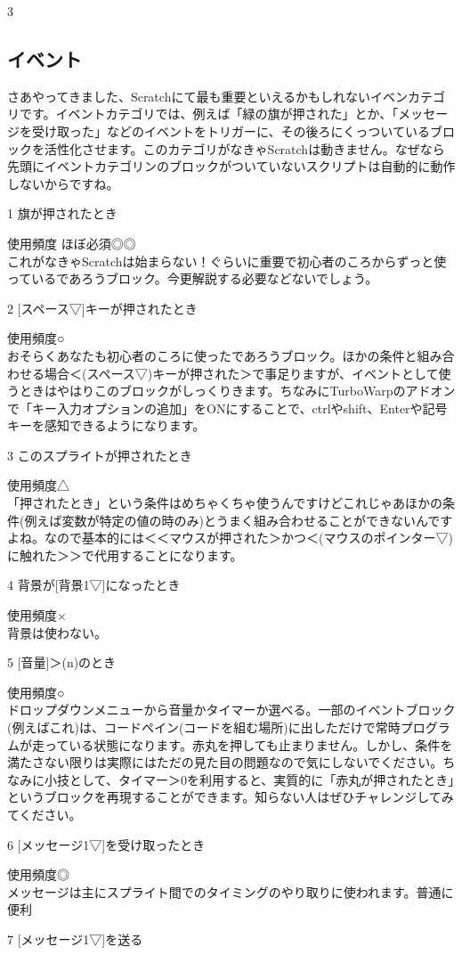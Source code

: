 \documentclass[b5paper,10pt]{jsarticle}
\begin{document}
\begin{multicols*}{3}
\subsection{イベント}
さあやってきました、Scratchにて最も重要といえるかもしれないイベンカテゴリです。イベントカテゴリでは、例えば「緑の旗が押された」とか、「メッセージを受け取った」などのイベントをトリガーに、その後ろにくっついているブロックを活性化させます。このカテゴリがなきゃScratchは動きません。なぜなら先頭にイベントカテゴリンのブロックがついていないスクリプトは自動的に動作しないからですね。
\begin{itembox}{1}
旗が押されたとき
\end{itembox}
使用頻度 ほぼ必須◎◎\\
これがなきゃScratchは始まらない！ぐらいに重要で初心者のころからずっと使っているであろうブロック。今更解説する必要などないでしょう。
\begin{itembox}{2}
[スペース▽]キーが押されたとき
\end{itembox}
使用頻度○\\
おそらくあなたも初心者のころに使ったであろうブロック。ほかの条件と組み合わせる場合＜(スペース▽)キーが押された＞で事足りますが、イベントとして使うときはやはりこのブロックがしっくりきます。ちなみにTurboWarpのアドオンで「キー入力オプションの追加」をONにすることで、ctrlやshift、Enterや記号キーを感知できるようになります。
\begin{itembox}{3}
このスプライトが押されたとき
\end{itembox}
使用頻度△\\
「押されたとき」という条件はめちゃくちゃ使うんですけどこれじゃあほかの条件(例えば変数が特定の値の時のみ)とうまく組み合わせることができないんですよね。なので基本的には＜＜マウスが押された＞かつ＜(マウスのポインター▽)に触れた＞＞で代用することになります。
\begin{itembox}{4}
背景が[背景1▽]になったとき
\end{itembox}
使用頻度×\\
背景は使わない。
\begin{itembox}{5}
[音量]＞(n)のとき
\end{itembox}
使用頻度○\\
ドロップダウンメニューから音量かタイマーか選べる。一部のイベントブロック(例えばこれ)は、コードペイン(コードを組む場所)に出しただけで常時プログラムが走っている状態になります。赤丸を押しても止まりません。しかし、条件を満たさない限りは実際にはただの見た目の問題なので気にしないでください。ちなみに小技として、タイマー＞0を利用すると、実質的に「赤丸が押されたとき」というブロックを再現することができます。知らない人はぜひチャレンジしてみてください。
\begin{itembox}{6}
[メッセージ1▽]を受け取ったとき
\end{itembox}
使用頻度◎\\
メッセージは主にスプライト間でのタイミングのやり取りに使われます。普通に便利
\begin{itembox}{7}
[メッセージ1▽]を送る


\end{itembox}
\end{multicols*}
\end{document}
